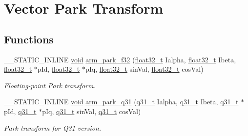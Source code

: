 \hypertarget{group__park}{\section{Vector Park Transform}
\label{group__park}
}
\subsection*{Functions}
\begin{DoxyCompactItemize}
\item 
\-\_\-\-\_\-\-S\-T\-A\-T\-I\-C\-\_\-\-I\-N\-L\-I\-N\-E \hyperlink{group___n_a_m_e_ga18028b8badbf1ea7e704ccac3c488e82}{void} \hyperlink{group__park_ga35b912a9cbf55e226cf2e5d98ba96bc1}{arm\-\_\-park\-\_\-f32} (\hyperlink{arm__math_8h_a4611b605e45ab401f02cab15c5e38715}{float32\-\_\-t} Ialpha, \hyperlink{arm__math_8h_a4611b605e45ab401f02cab15c5e38715}{float32\-\_\-t} Ibeta, \hyperlink{arm__math_8h_a4611b605e45ab401f02cab15c5e38715}{float32\-\_\-t} $\ast$p\-Id, \hyperlink{arm__math_8h_a4611b605e45ab401f02cab15c5e38715}{float32\-\_\-t} $\ast$p\-Iq, \hyperlink{arm__math_8h_a4611b605e45ab401f02cab15c5e38715}{float32\-\_\-t} sin\-Val, \hyperlink{arm__math_8h_a4611b605e45ab401f02cab15c5e38715}{float32\-\_\-t} cos\-Val)
\begin{DoxyCompactList}\small\item\em Floating-\/point Park transform. \end{DoxyCompactList}\item 
\-\_\-\-\_\-\-S\-T\-A\-T\-I\-C\-\_\-\-I\-N\-L\-I\-N\-E \hyperlink{group___n_a_m_e_ga18028b8badbf1ea7e704ccac3c488e82}{void} \hyperlink{group__park_gacf9cfc380b76e508fb5dfc1154887c1b}{arm\-\_\-park\-\_\-q31} (\hyperlink{arm__math_8h_adc89a3547f5324b7b3b95adec3806bc0}{q31\-\_\-t} Ialpha, \hyperlink{arm__math_8h_adc89a3547f5324b7b3b95adec3806bc0}{q31\-\_\-t} Ibeta, \hyperlink{arm__math_8h_adc89a3547f5324b7b3b95adec3806bc0}{q31\-\_\-t} $\ast$p\-Id, \hyperlink{arm__math_8h_adc89a3547f5324b7b3b95adec3806bc0}{q31\-\_\-t} $\ast$p\-Iq, \hyperlink{arm__math_8h_adc89a3547f5324b7b3b95adec3806bc0}{q31\-\_\-t} sin\-Val, \hyperlink{arm__math_8h_adc89a3547f5324b7b3b95adec3806bc0}{q31\-\_\-t} cos\-Val)
\begin{DoxyCompactList}\small\item\em Park transform for Q31 version. \end{DoxyCompactList}\end{DoxyCompactItemize}



